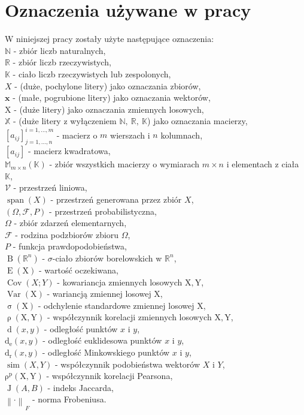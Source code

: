 \documentclass[12pt,a4paper]{report}
\newcommand{\setR}{\mathbb{R}}
\newcommand{\setK}{\mathbb{K}}
\newcommand{\setN}{\mathbb{N}}
\newcommand{\ro}[2]{\operatorname{\rho}\left( {#1},{#2} \right)}
\newcommand{\rop}[2]{\operatorname{\rho^p}\left( {#1},{#2} \right)}
\newcommand{\J}[2]{\operatorname{J}\left({#1}, {#2} \right)}
\newcommand{\similarity}[2]{\operatorname{sim}\left({#1}, {#2} \right)}
\newcommand{\przestrzen}[1]{\operatorname{span}\left({#1} \right)}
\newcommand{\distance}[2]{\operatorname{d}\left({#1}, {#2} \right)}
\newcommand{\distancee}[2]{\operatorname{d_r}\left({#1}, {#2} \right)}
\newcommand{\distanceee}[2]{\operatorname{d_e}\left({#1}, {#2} \right)}
\newcommand{\Covariance}[2]{\operatorname{Cov}\left({#1}; {#2} \right)}
\newcommand{\norm}[2][]{\left\| {#2} \right\|_{#1}}
\newcommand{\variance}[1]{\operatorname{Var}\left({#1} \right)}
\newcommand{\e}[1]{\operatorname{E}\left({#1} \right)}
\newcommand{\standard}[1]{\operatorname{\sigma}\left({#1} \right)}
\newcommand{\sigmacialo}[1]{\operatorname{B}\left({#1} \right)}
\begin{document}
\section{Oznaczenia używane w pracy}
W niniejszej pracy zostały użyte następujące oznaczenia:
\\$\setN$ - zbiór liczb naturalnych,
\\$\setR$ - zbiór liczb rzeczywistych,
\\$\setK$ - ciało liczb rzeczywistych lub zespolonych,
\\$\mathit{X}$ - (duże, pochylone litery) jako oznaczania zbiorów,
\\$\mathbf{x}$ - (małe, pogrubione litery) jako oznaczania wektorów,
\\$\mathrm{X}$ - (duże litery) jako oznaczania zmiennych losowych,
\\$\mathbb{X}$ - (duże litery z wyłączeniem $\setN, \: \setR, \: \setK$) jako oznaczania macierzy,
\\$[a_{ij}]_{j = 1, \ldots, n}^{i = 1, \ldots , m}$ - macierz o $m$ wierszach i $n$ kolumnach,
\\$[a_{ij}]$ - macierz kwadratowa,
\\$\mathbb{M}_{m \times n}(\setK)$ - zbiór wszystkich macierzy o wymiarach $m \times n$ i elementach z ciała $\setK$,
\\$\mathcal{V}$ - przestrzeń liniowa,
\\$\przestrzen{\mathit{X}}$ - przestrzeń generowana przez zbiór $\mathit{X}$,
\\$(\Omega, \mathcal{F}, P)$ - przestrzeń probabilistyczna,
\\$\Omega$ - zbiór zdarzeń elementarnych,
\\$\mathcal{F}$ - rodzina podzbiorów zbioru $\Omega$,
\\$P$ - funkcja prawdopodobieństwa,
\\$\sigmacialo{\setR^n}$ - $\sigma$-ciało zbiorów borelowskich w $\setR^n$,
\\$\e{\mathrm{X}}$ - wartość oczekiwana,
\\$\Covariance{X}{Y}$ - kowariancja zmiennych losowych $\mathrm{X},\mathrm{Y}$,
\\$\variance{\mathrm{X}}$ - wariancją zmiennej losowej $\mathrm{X}$,
\\$\standard{\mathrm{X}}$ - odchylenie standardowe zmiennej losowej $\mathrm{X}$,
\\$\ro{\mathrm{X}}{\mathrm{Y}}$ - współczynnik korelacji zmiennych losowych $\mathrm{X},\mathrm{Y}$,
\\$\distance{x}{y}$ - odległość punktów $x$ i $y$,
\\$\distanceee{x}{y}$ - odległość euklidesowa punktów $x$ i $y$,
\\$\distancee{x}{y}$ - odległość Minkowskiego punktów $x$ i $y$,
\\$\similarity{X}{Y}$ - współczynnik podobieństwa wektorów $X$ i $Y$,
\\$\rop{\mathrm{X}}{\mathrm{Y}}$ - współczynnik korelacji Pearsona,
\\$\J{\mathit{A}}{\mathit{B}}$ - indeks Jaccarda,
\\ ${\norm{\cdot}}_F$ - norma Frobeniusa.
\end{document}
